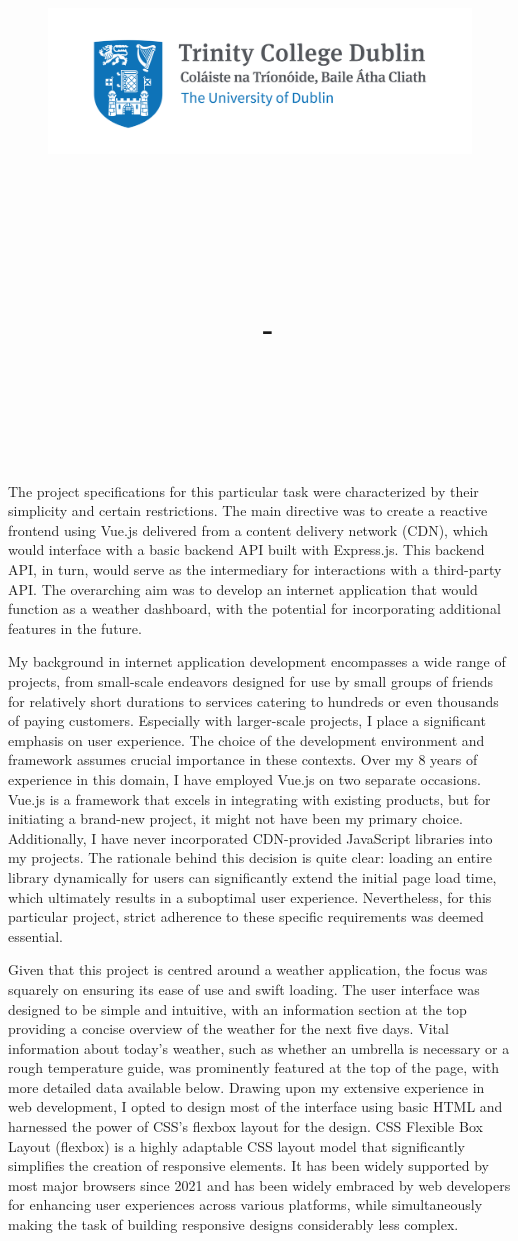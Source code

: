 \documentclass[a4paper,12pt]{article}
\title{
    \vspace{-1in}
    \begin{figure}[!ht]
    \flushleft
    \includegraphics[width=0.4\linewidth]{Trinity_RGB_transparent_main.png}
    \end{figure}
    \vspace{-0.5cm}
    \hrulefill \\
    \vspace{1cm}
    \textmd{\textbf{\moduleCode\ \moduleName}}\\
    \textmd{\textbf{\assignmentTitle}}\\
    \textmd{\authorName\ - \authorID}\\
    \textmd{\reportDate}\\
    \vspace{0.5cm}
    \hrulefill \\
}
\date{}
\author{}
\begin{document}
The project specifications for this particular task were characterized by their simplicity and certain restrictions. The main directive was to create a reactive frontend using Vue.js delivered from a content delivery network (CDN), which would interface with a basic backend API built with Express.js. This backend API, in turn, would serve as the intermediary for interactions with a third-party API. The overarching aim was to develop an internet application that would function as a weather dashboard, with the potential for incorporating additional features in the future.

My background in internet application development encompasses a wide range of projects, from small-scale endeavors designed for use by small groups of friends for relatively short durations to services catering to hundreds or even thousands of paying customers. Especially with larger-scale projects, I place a significant emphasis on user experience. The choice of the development environment and framework assumes crucial importance in these contexts. Over my 8 years of experience in this domain, I have employed Vue.js on two separate occasions. Vue.js is a framework that excels in integrating with existing products, but for initiating a brand-new project, it might not have been my primary choice. Additionally, I have never incorporated CDN-provided JavaScript libraries into my projects. The rationale behind this decision is quite clear: loading an entire library dynamically for users can significantly extend the initial page load time, which ultimately results in a suboptimal user experience. Nevertheless, for this particular project, strict adherence to these specific requirements was deemed essential.

Given that this project is centred around a weather application, the focus was squarely on ensuring its ease of use and swift loading. The user interface was designed to be simple and intuitive, with an information section at the top providing a concise overview of the weather for the next five days. Vital information about today's weather, such as whether an umbrella is necessary or a rough temperature guide, was prominently featured at the top of the page, with more detailed data available below. Drawing upon my extensive experience in web development, I opted to design most of the interface using basic HTML and harnessed the power of CSS's flexbox layout for the design. CSS Flexible Box Layout (flexbox) is a highly adaptable CSS layout model that significantly simplifies the creation of responsive elements. It has been widely supported by most major browsers since 2021 and has been widely embraced by web developers for enhancing user experiences across various platforms, while simultaneously making the task of building responsive designs considerably less complex.
\end{document}
